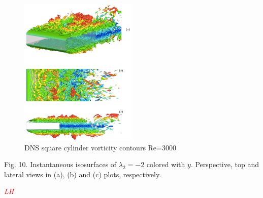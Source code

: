 \documentclass[journal]{new-aiaa}
\begin{document}
\begin{figure}[H]
\begin{center}
\includegraphics[width=0.5\textwidth]{Images/logan/cimarelli2018direct_vorticity.pdf}
\caption{ DNS square cylinder vorticity contours Re=3000 \cite{cimarelli2018direct} }
\label{fig:dnsRectCylPressure}
\end{center}
\end{figure}

Fig. 10. Instantaneous isosurfaces of $\lambda_2=-2$ colored with $y$. Perspective, top and lateral views in (a), (b) and (c) plots, respectively.







\textcolor{red}{\emph{LH}}
\end{document}
